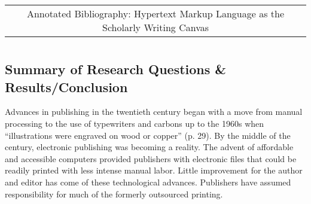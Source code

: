 \documentclass[leavefloats]{apa6e}\usepackage[]{graphicx}\usepackage[]{color}
\begin{document}
\newsavebox{\mytitle}
\begin{lrbox}{\mytitle}
\begin{tabular}{c}
  \normalfont Annotated Bibliography: Hypertext Markup Language as the Scholarly Writing Canvas
\end{tabular}
\end{lrbox}

\title{\usebox\mytitle}

\author{Tyler W. Rinker\\
University at Buffalo/SUNY \\ \raggedright \vspace{8cm} LAI 615: Introduction to Curriculum, Instruction, and Science of Learning \\ Annotated Bibliography \\
}
\date{\today}
\maketitle




\section{\textcite{Adams2002}}





\regpar



\subsection{Summary of Research Questions \& Results/Conclusion} %
Advances in publishing in the twentieth century began with a move from manual processing to the use of typewriters and carbons up to the 1960s when ``illustrations were engraved on wood or copper'' (p. 29).  By the middle of the century, electronic publishing was becoming a reality.  The advent of affordable and accessible computers provided publishers with electronic files that could be readily printed with less intense manual labor.  Little improvement for the author and editor has come of these technological advances.  Publishers have assumed responsibility for much of the formerly outsourced printing.
\end{document}
